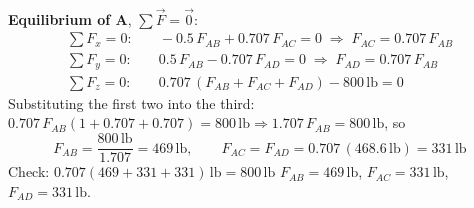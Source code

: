 \documentclass[11pt]{article}
\newcommand{\lb}{\,\mathrm{lb}}
\begin{document}
{\begin{align*}
\end{align*}
\textbf{Equilibrium of A}, $\sum\vec F=\vec 0$:
\begin{align*}
\sum F_x = 0:&\quad -0.5\,F_{AB} + 0.707\,F_{AC} = 0 \;\Rightarrow\; F_{AC} = 0.707\,F_{AB}\\
\sum F_y = 0:&\quad 0.5\,F_{AB} - 0.707\,F_{AD} = 0 \;\Rightarrow\; F_{AD} = 0.707\,F_{AB}\\
\sum F_z = 0:&\quad 0.707\,(F_{AB}+F_{AC}+F_{AD}) - 800\lb = 0
\end{align*}
Substituting the first two into the third: $0.707\,F_{AB}(1+0.707+0.707) = 800\lb \Rightarrow 1.707\,F_{AB} = 800\lb$, so
\[
F_{AB} = \frac{800\lb}{1.707} = 469\lb,\qquad
F_{AC} = F_{AD} = 0.707\,(468.6\lb) = 331\lb
\]
Check: $0.707(469+331+331)\lb = 800\lb$ \checkmark
}{
$F_{AB} = 469\lb$, $F_{AC} = 331\lb$, $F_{AD} = 331\lb$.
}
\end{document}
